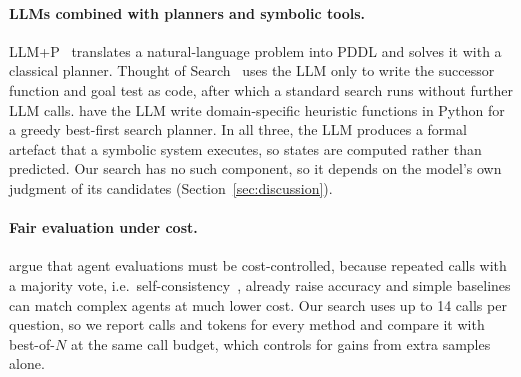 \paragraph{LLMs combined with planners and symbolic tools.}
LLM+P~\citep{liu2023llmp} translates a natural-language problem into PDDL and solves it with a
classical planner. Thought of Search~\citep{katz2024tos} uses the LLM only to write the successor
function and goal test as code, after which a standard search runs without further LLM calls.
\citet{correa2025heuristics} have the LLM write domain-specific heuristic functions in Python for a
greedy best-first search planner. In all three, the LLM produces a formal artefact that a symbolic
system executes, so states are computed rather than predicted. Our search has no such component,
so it depends on the model's own judgment of its candidates (Section~\ref{sec:discussion}).

\paragraph{Fair evaluation under cost.}
\citet{kapoor2024agents} argue that agent evaluations must be cost-controlled, because repeated
calls with a majority vote, i.e.\ self-consistency~\citep{wang2023selfconsistency}, already raise accuracy and simple baselines can match complex agents at
much lower cost. Our search uses up to 14 calls per question, so we report calls and tokens for
every method and compare it with best-of-$N$ at the same call budget, which controls for gains
from extra samples alone.
